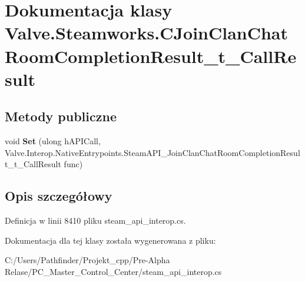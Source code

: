 \hypertarget{class_valve_1_1_steamworks_1_1_c_join_clan_chat_room_completion_result__t___call_result}{}\section{Dokumentacja klasy Valve.\+Steamworks.\+C\+Join\+Clan\+Chat\+Room\+Completion\+Result\+\_\+t\+\_\+\+Call\+Result}
\label{class_valve_1_1_steamworks_1_1_c_join_clan_chat_room_completion_result__t___call_result}
\subsection*{Metody publiczne}
\begin{DoxyCompactItemize}
\item 
\mbox{\label{class_valve_1_1_steamworks_1_1_c_join_clan_chat_room_completion_result__t___call_result_a11837b2f3070fa96f61b05de8431d0bb}} 
void {\bfseries Set} (ulong h\+A\+P\+I\+Call, Valve.\+Interop.\+Native\+Entrypoints.\+Steam\+A\+P\+I\+\_\+\+Join\+Clan\+Chat\+Room\+Completion\+Result\+\_\+t\+\_\+\+Call\+Result func)
\end{DoxyCompactItemize}


\subsection{Opis szczegółowy}


Definicja w linii 8410 pliku steam\+\_\+api\+\_\+interop.\+cs.



Dokumentacja dla tej klasy została wygenerowana z pliku\+:\begin{DoxyCompactItemize}
\item 
C\+:/\+Users/\+Pathfinder/\+Projekt\+\_\+cpp/\+Pre-\/\+Alpha Relase/\+P\+C\+\_\+\+Master\+\_\+\+Control\+\_\+\+Center/steam\+\_\+api\+\_\+interop.\+cs\end{DoxyCompactItemize}

